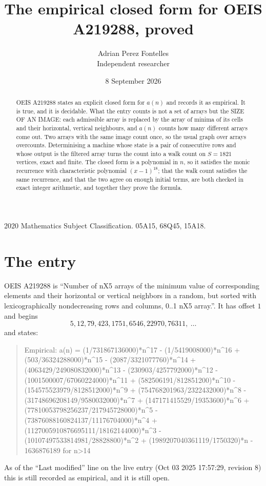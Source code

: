 \documentclass[11pt,a4paper]{article}
\title{The empirical closed form for OEIS A219288, proved}
\author{Adrian Perez Fontelles\\ \small Independent researcher}
\date{8 September 2026}
\theoremstyle{plain}
\theoremstyle{definition}
\begin{document}
\maketitle

\begin{abstract}
OEIS A219288 states an explicit closed form for $a(n)$ and records it as empirical. It is true, and
it is decidable. What the entry counts is not a set of arrays but the SIZE OF AN IMAGE: each
admissible array is replaced by the array of minima of its cells and their horizontal, vertical neighbours,
and $a(n)$ counts how many different arrays come out. Two arrays with the same image count
once, so the usual graph over arrays overcounts. Determinising a machine whose state is a pair
of consecutive rows and whose output is the filtered array turns the count into a walk count on
$S=1821$ vertices, exact and finite. The closed form is a polynomial in $n$, so it satisfies the
monic recurrence with characteristic polynomial $(x-1)^{18}$; that the walk count
satisfies the same recurrence, and that the two agree on enough initial terms, are both checked
in exact integer arithmetic, and together they prove the formula.
\end{abstract}

\noindent\small 2020 Mathematics Subject Classification. 05A15, 68Q45, 15A18.\normalsize

\section{The entry}

OEIS A219288 is ``Number of nX5 arrays of the minimum value of corresponding elements and their horizontal or vertical neighbors in a random, but sorted with lexicographically nondecreasing rows and columns, 0..1 nX5 array.''. It has offset $1$ and begins
\[
5, 12, 79, 423, 1751, 6546, 22970, 76311,\ \dots
\]
and states:
\begin{quote}
Empirical: a(n) = (1/731867136000)*n\^{}17 - (1/5419008000)*n\^{}16 + (503/36324288000)*n\^{}15 - (2087/3321077760)*n\^{}14 + (4063429/249080832000)*n\^{}13 - (230903/4257792000)*n\^{}12 - (1001500007/67060224000)*n\^{}11 + (582506191/812851200)*n\^{}10 - (154575523979/8128512000)*n\^{}9 + (754768201963/2322432000)*n\^{}8 - (31748696208149/9580032000)*n\^{}7 + (147171415529/19353600)*n\^{}6 + (77810053798256237/217945728000)*n\^{}5 - (73876088160824137/11176704000)*n\^{}4 + (1127005910876695111/18162144000)*n\^{}3 - (10107497533814981/28828800)*n\^{}2 + (1989207040361119/1750320)*n - 1636876189 for n>14
\end{quote}
As of the ``Last modified'' line on the live entry (Oct 03 2025 17:57:29, revision 8)
this is still recorded as empirical, and it is still open.
\end{document}
